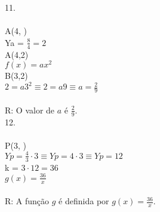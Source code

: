 \documentclass[12pt]{article}
\begin{document}
11.\\\\
A(4, )\\
Ya = $\frac{8}{4}=2$\\
A(4,2)\\
$f(x)=ax^2$\\
B(3,2)\\
$2=a3^2\equiv2=a9\equiv a=\frac{2}{9}$\\\\
R: O valor de $a$ é $\frac{2}{9}$.\\

12.\\\\
P(3, )\\
$Yp=\frac{4}{3}\cdot3\equiv Yp=4\cdot3\equiv Yp=12$\\
k = $3\cdot12=36$\\
$g(x)=\frac{36}{x}$\\\\
R: A função $g$ é definida por $g(x)=\frac{36}{x}$.\\
\end{document}
